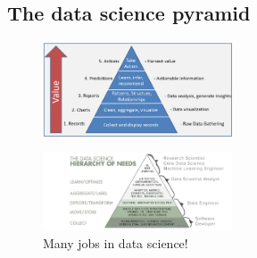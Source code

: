\documentclass{article}
\begin{document}
\subsection{The data science pyramid}

\begin{figure}[H]
    \centering
    \includegraphics[width=0.5\textwidth]{data-science-pyramid.png}
\end{figure}


\begin{figure}[H]
    \centering
    \includegraphics[width=0.5\textwidth]{data-science-hierarchy-of-needs.jpg}
    \caption{Many jobs in data science!}
\end{figure}
\end{document}
